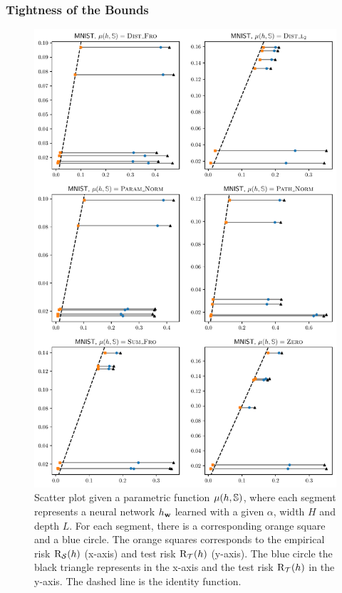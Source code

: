 \subsubsection{Tightness of the Bounds}
\label{chap:dis-mu:sec:tightness}

\begin{figure}
    \centering
    \includegraphics[width=0.77\linewidth]{chapter_7/figures/gap_mnist.pdf}
    \caption[Tightness of  on MNIST]{
    Scatter plot given a parametric function $\operatorname{\mu}(h, \mathbb{S})$, where each segment represents a neural network $h_{\mathbf{w}}$ learned with a given $\alpha$, width $H$ and depth $L$.
    For each segment, there is a corresponding orange square and a blue circle.
    The orange squares corresponds to the empirical risk $\text{R}_{\mathcal{S}}(h)$ (x-axis) and test risk $\text{R}_{\mathcal{T}}(h)$ (y-axis).
    The blue circle \resp the black triangle represents  \resp {} in the x-axis and the test risk $\text{R}_{\mathcal{T}}(h)$ in the y-axis.
    The dashed line is the identity function.
    }
    \label{chap:dis-mu:fig:gap-mnist}
\end{figure}

